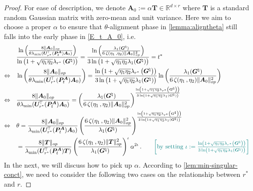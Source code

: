 \begin{proof}
For ease of description, we denote $\bm A_0 := \alpha \bm T \in \mathbb{R}^{d \times r}$ where $\bm T$ is a standard random Gaussian matrix with zero-mean and unit variance.
Here we aim to choose a proper $\alpha$ to ensure that $\theta$-alignment phase in \cref{lemma:aligntheta} still falls into the early phase in \cref{E_t_A_0}, i.e.
    \begin{align*}
        & \frac{\ln\left(\frac{8\|\bm A_0\|_{op}}{\theta \lambda_{\min}(\bm U^{\!\top}_{r^*}(\bm P_t^{\bm A}) \bm A_0)}\right)}{\ln\left(1+\sqrt{\eta_1 \eta_2}\lambda_{r^*}\left({\bm G}^{\natural}\right)\right)} = \frac{\ln\left(\frac{\lambda_1({\bm G}^{\natural})}{6\,\zeta(\eta_1\,,\eta_2) \|\bm A_0\|_{op}^2}\right)}{3\ln\left(1+\sqrt{\eta_1 \eta_2}\lambda_1({\bm G}^{\natural})\right)}=t^*\\
        \Leftrightarrow\quad & \ln\left(\frac{8\|\bm A_0\|_{op}}{\theta \lambda_{\min}(\bm U^{\!\top}_{r^*}(\bm P_t^{\bm A}) \bm A_0)}\right) = \frac{\ln\left(1+\sqrt{\eta_1 \eta_2}\lambda_{r^*}\left({\bm G}^{\natural}\right)\right)}{3\ln\left(1+\sqrt{\eta_1 \eta_2}\lambda_1({\bm G}^{\natural})\right)}\ln\left(\frac{\lambda_1({\bm G}^{\natural})}{6\,\zeta(\eta_1\,,\eta_2) \|\bm A_0\|_{op}^2}\right)\\
        \Leftrightarrow\quad & \frac{8\|\bm A_0\|_{op}}{\theta \lambda_{\min}(\bm U^{\!\top}_{r^*}(\bm P_t^{\bm A}) \bm A_0)} = \left(\frac{\lambda_1({\bm G}^{\natural})}{6\,\zeta(\eta_1\,,\eta_2) \|\bm A_0\|_{op}^2}\right)^\frac{\ln\left(1+\sqrt{\eta_1 \eta_2}\lambda_{r^*}\left({\bm G}^{\natural}\right)\right)}{3\ln\left(1+\sqrt{\eta_1 \eta_2}\lambda_1({\bm G}^{\natural})\right)}\\
        \Leftrightarrow\quad & \theta = \frac{8\|\bm A_0\|_{op}}{\lambda_{\min}(\bm U^{\!\top}_{r^*}(\bm P_t^{\bm A}) \bm A_0)} \left(\frac{6\,\zeta(\eta_1\,,\eta_2) \|\bm A_0\|_{op}^2}{\lambda_1({\bm G}^{\natural})}\right)^{\frac{\ln\left(1+\sqrt{\eta_1 \eta_2}\lambda_{r^*}\left({\bm G}^{\natural}\right)\right)}{3\ln\left(1+\sqrt{\eta_1 \eta_2}\lambda_1({\bm G}^{\natural})\right)}}\\
        & = \frac{8\|\bm T\|_{op}}{\lambda_{\min}(\bm U^{\!\top}_{r^*}(\bm P_t^{\bm A}) \bm T)} \left(\frac{6\,\zeta(\eta_1\,,\eta_2) \|\bm T\|_{op}^2}{\lambda_1({\bm G}^{\natural})}\right)^\iota \alpha^{2\iota}\,. \tag*{\color{teal}$\left[\text{by setting }\iota:=\frac{\ln\left(1+\sqrt{\eta_1 \eta_2}\lambda_{r^*}\left({\bm G}^{\natural}\right)\right)}{3\ln\left(1+\sqrt{\eta_1 \eta_2}\lambda_1({\bm G}^{\natural})\right)}\right]$}
    \end{align*}
    In the next, we will discuss how to pick up $\alpha$.
     According to \cref{lem:min-singular-conct}, we need to consider the following two cases on the relationship between $r^*$ and $r$.
    

\end{proof}
